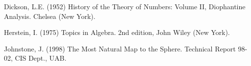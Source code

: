 
\begin{thebibliography}{Johnstone 98}

Dickson, L.E. (1952) History of the Theory of Numbers: Volume II,
Diophantine Analysis.  Chelsea (New York).

Herstein, I. (1975) Topics in Algebra.
2nd edition, John Wiley (New York).

Johnstone, J. (1998)
The Most Natural Map to the Sphere.
Technical Report 98-02, CIS Dept., UAB.

\end{thebibliography}


